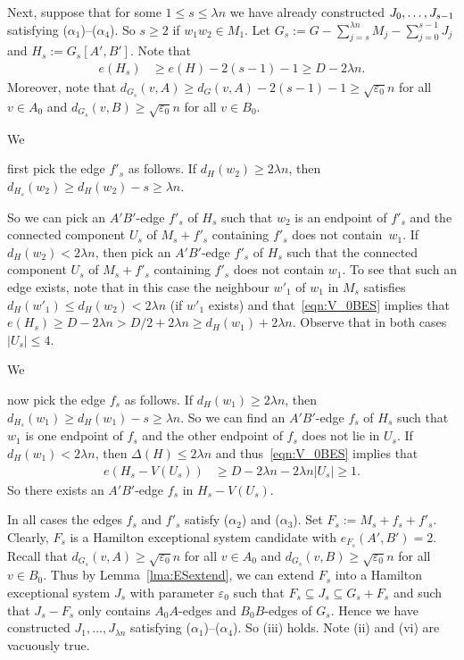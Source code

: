 \documentclass{memo-l}
\def\COMMENT#1{}
\def\eps{\varepsilon}
\def\epszero{\eps_0}
\numberwithin{section}{chapter}
\numberwithin{equation}{section}
\numberwithin{firstthm}{section}
\numberwithin{figure}{section}
\begin{document}
Next, suppose that for some $1\le s\le \lambda n$ we have already constructed $J_0, \dots , \break J_{s-1}$ satisfying ($\alpha_1$)--($\alpha_4$). 
So $s \ge 2$ if $w_1w_2 \in M_1$. Let $G_s := G - \sum_{j=s}^{\lambda n} M_j - \sum_{j=0}^{s-1} J_{j} $ and $H_s := G_s[A',B']$.
Note that
\begin{align} \label{eqn:V_0BES}
e(H_s) & \ge e(H) - 2(s-1) -1  \ge D - 2 \lambda n .
\end{align}
Moreover, note that $d_{G_s}(v,A) \ge d_{G}(v,A) - 2(s-1)-1 \ge \sqrt{ \epszero} n $ for all $v \in A_0$
and $d_{G_s}(v,B) \ge \sqrt{ \epszero} n $ for all $v \in B_0$.

We%
   \COMMENT{Daniela: new sentence}
first pick the edge $f'_s$ as follows.
If $d_{H}(w_2) \ge 2\lambda n$, then $d_{H_s}(w_2) \ge d_{H}(w_2) - s \ge \lambda n$.%
    \COMMENT{Since each of $J_1,\dots,J_{s-1}$ contains precisely two $A'B'$-edges, these 2 edges will be independent.
So at most one of them can be incident to $w_2$.}
So we can pick an $A'B'$-edge $f'_s$ of $H_s$ such that $w_2$ is an endpoint of $f'_s$ and the connected component $U_s$ of $M_s+f'_s$ containing $f'_s$
does not contain~$w_1$. If $d_{H}(w_2) < 2 \lambda n$, then pick an $A'B'$-edge $f'_s$ of $H_s$ such that the connected component
$U_s$ of $M_s+f'_s$ containing $f'_s$ does not contain $w_1$. To see that such an edge exists, note that in this case the neighbour $w'_1$ of
$w_1$ in $M_s$ satisfies $d_H(w'_1)\le d_H(w_2)< 2 \lambda n$ (if $w'_1$ exists) and that~\eqref{eqn:V_0BES}
implies that $e(H_s) \ge D- 2 \lambda n >D/2+2 \lambda n\ge d_H(w_1)+2 \lambda n$.
Observe that in both cases $|U_s| \le 4$.

We%
   \COMMENT{Daniela: new sentence and more detail in the next 2 sentences}
now pick the edge $f_s$ as follows. If $d_{H}(w_1) \ge 2 \lambda n$, then $d_{H_s}(w_1) \ge d_{H}(w_1) - s \ge \lambda n$.
So we can find an $A'B'$-edge $f_s$ of $H_s$
such that $w_1$ is one endpoint of $f_s$ and the other endpoint of $f_s$ does not lie in $U_s$.
If $d_{H}(w_1) < 2 \lambda n$, then $\Delta(H) \le 2 \lambda n$ and thus~\eqref{eqn:V_0BES} implies that
\begin{align} \nonumber
e(H_s - V(U_s)) & \ge  D- 2\lambda n - 2 \lambda n |U_s|  \ge 1 .
\end{align}
So there exists an $A'B'$-edge $f_s$ in $H_s-V(U_s)$.

In all cases the edges $f_s$ and $f'_s$ satisfy ($\alpha_2$) and ($\alpha_3$).
Set $F_s := M_s +f_s +f'_s$. Clearly, $F_s$ is a Hamilton exceptional system candidate with $e_{F_s}(A',B') = 2$.
Recall that $d_{G_s}(v,A) \ge \sqrt{ \epszero} n $ for all $v \in A_0$ and $d_{G_s}(v,B) \ge \sqrt{ \epszero} n $ for all $v \in B_0$.
Thus by Lemma~\ref{lma:ESextend}, we can extend $F_s$ into a Hamilton exceptional system $J_s$ with parameter $\eps_0$
such that $F_s \subseteq J_s\subseteq G_s+F_s$ and such that $J_s - F_s$ only contains $A_0A$-edges and $B_0B$-edges of $G_s$.
Hence we have constructed $J_1, \dots ,J_{\lambda n }$ satisfying ($\alpha_1$)--($\alpha_4$). 
So (iii) holds. Note (ii) and (vi) are vacuously true.
\end{document}
